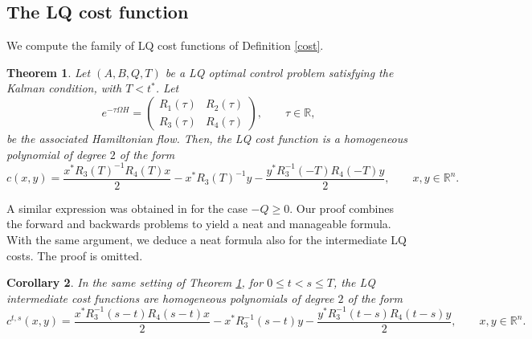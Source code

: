 \documentclass[reqno]{amsart}
\theoremstyle{plain}
\newtheorem{thm}{Theorem}[section]
\newtheorem{cor}[thm]{Corollary}
\theoremstyle{definition}
\theoremstyle{remark}
\begin{document}
	
	\subsection{The LQ cost function}
	We compute the family of LQ cost functions of Definition \ref{cost}. %
	\begin{thm}\label{comp_cost}
		Let $(A,B,Q,T)$ be a LQ optimal control problem  satisfying the Kalman condition, with $T<t^*$. Let 
		\begin{equation}
			e^{-\tau\Omega H}=\begin{pmatrix}
				R_1(\tau) & R_2(\tau)\\
				R_3(\tau) & R_4(\tau)
			\end{pmatrix},\qquad \tau\in\mathbb{R},
		\end{equation}
		be the associated Hamiltonian flow. Then, the LQ cost function is a homogeneous polynomial of degree $2$ of the form
		\begin{equation}\label{formula_cost_LQ}
			c(x,y)=\frac{x^*R_3(T)^{-1}R_4(T)x}{2}-x^*R_3(T)^{-1}y-\frac{y^*R_3^{-1}(-T)R_4(-T)y}{2},\qquad x,y\in\mathbb{R}^n.
		\end{equation}
	\end{thm}
A similar expression was obtained in \cite{hinpomriff2011} for the case $-Q\geq0$. Our proof combines the forward and backwards problems to yield a neat and manageable formula. 
With the same argument, we deduce a neat formula also for the intermediate LQ costs. The proof is omitted.
	\begin{cor} In the same setting of Theorem \ref{comp_cost}, for $0\leq t<s\leq T$, the LQ intermediate cost functions are homogeneous polynomials of degree $2$ of the form
		\begin{equation}
			c^{t,s}(x,y)=\frac{x^*R_3^{-1}(s-t)R_4(s-t)x}{2}-x^*R_3^{-1}(s-t)y-\frac{y^*R_3^{-1}(t-s)R_4(t-s)y}{2},\qquad x,y\in\mathbb{R}^n.
		\end{equation}
	\end{cor}
\end{document}
